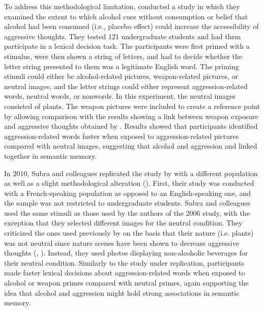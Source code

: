 \documentclass[serif, authorddate, twocolumn, empirical]{jote-article}
\begin{document}
To address this methodological limitation, \textcite{BartholowHeinz2006} conducted a study in which they examined the extent to which alcohol cues without consumption or belief that alcohol had been consumed (i.e., placebo effect) could increase the accessibility of aggressive thoughts. They tested 121 undergraduate students and had them participate in a lexical decision task. The participants were first primed with a stimulus, were then shown a string of letters, and had to decide whether the letter string presented to them was a legitimate English word. The priming stimuli could either be alcohol-related pictures, weapon-related pictures, or neutral images, and the letter strings could either represent aggression-related words, neutral words, or nonwords. In this experiment, the neutral images consisted of plants. The weapon pictures were included to create a reference point by allowing comparison with the results showing a link between weapon exposure and aggressive thoughts obtained by \textcite{AndersonJrJBartholow1998}. Results showed that participants identified aggression-related words faster when exposed to aggression-related pictures compared with neutral images, suggesting that alcohol and aggression and linked together in semantic memory. 

In 2010, Subra and colleagues replicated the study by \textcite{BartholowHeinz2006} with a different population as well as a slight methodological alteration (\cite{SubraMullerBegueLBushmanDelmas2010}). First, their study was conducted with a French-speaking population as opposed to an English-speaking one, and the sample was not restricted to undergraduate students. Subra and colleagues used the same stimuli as those used by the authors of the 2006 study, with the exception that they selected different images for the neutral condition. They criticized the ones used previously by \textcite{BartholowHeinz2006} on the basis that their nature (i.e. plants) was not neutral since nature scenes have been shown to decrease aggressive thoughts (\cite{KuoSullivan2001}, \cite{KuoSullivan2001}). Instead, they used photos displaying non-alcoholic beverages for their neutral condition. Similarly to the study under replication, participants made faster lexical decisions about aggression-related words when exposed to alcohol or weapon primes compared with neutral primes, again supporting the idea that alcohol and aggression might hold strong associations in semantic memory.
\end{document}
